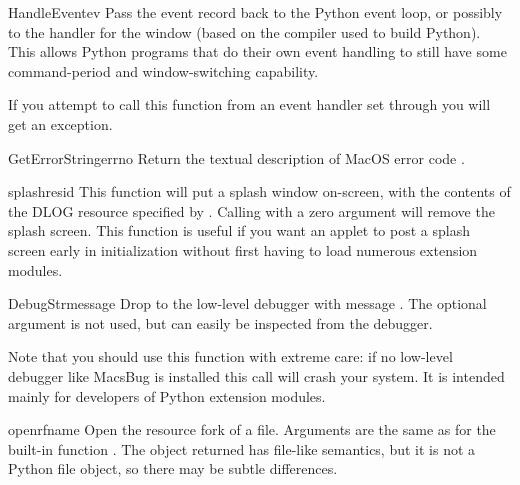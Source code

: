 \begin{funcdesc}{HandleEvent}{ev}
Pass the event record  back to the Python event loop, or
possibly to the handler for the  window (based on the
compiler used to build Python). This allows Python programs that do
their own event handling to still have some command-period and
window-switching capability.

If you attempt to call this function from an event handler set through
 you will get an exception.
\end{funcdesc}

\begin{funcdesc}{GetErrorString}{errno}
Return the textual description of MacOS error code .
\end{funcdesc}

\begin{funcdesc}{splash}{resid}
This function will put a splash window
on-screen, with the contents of the DLOG resource specified by
. Calling with a zero argument will remove the splash
screen. This function is useful if you want an applet to post a splash screen
early in initialization without first having to load numerous
extension modules.
\end{funcdesc}

\begin{funcdesc}{DebugStr}{message }
Drop to the low-level debugger with message . The
optional  argument is not used, but can easily be
inspected from the debugger.

Note that you should use this function with extreme care: if no
low-level debugger like MacsBug is installed this call will crash your
system. It is intended mainly for developers of Python extension
modules.
\end{funcdesc}

\begin{funcdesc}{openrf}{name }
Open the resource fork of a file. Arguments are the same as for the
built-in function . The object returned has file-like
semantics, but it is not a Python file object, so there may be subtle
differences.
\end{funcdesc}
